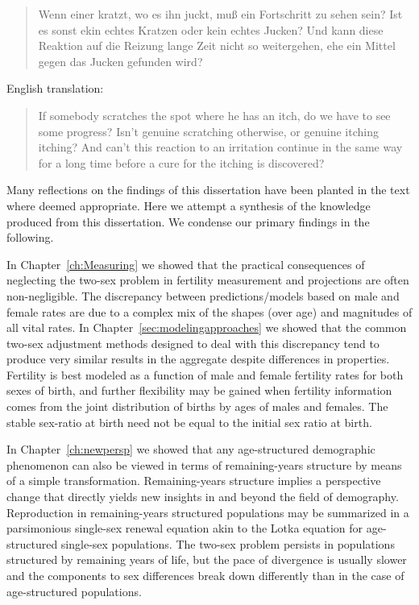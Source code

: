\FloatBarrier
\label{sec:reflections}

\begin{singlespace}
\begin{quote}
Wenn einer kratzt, wo es ihn juckt, mu{\ss} ein Fortschritt zu sehen sein? Ist
es sonst ekin echtes Kratzen oder kein echtes Jucken? Und kann diese Reaktion
auf die Reizung lange Zeit nicht so weitergehen, ehe ein Mittel gegen das Jucken
gefunden wird?
\citep{wittgenstein1984culture}
\end{quote}

English translation:
\begin{quote}
 If somebody scratches the spot where he has an itch, do we have to see 
 some progress? Isn't genuine scratching otherwise, or genuine itching 
itching? And can't this reaction to an irritation continue in the 
same way for a long time before a cure for the itching is discovered?
\citep{wittgenstein1984culture}
\end{quote}
\end{singlespace}

Many reflections on the findings of this dissertation have been planted in the
text where deemed appropriate. Here we attempt a synthesis of the
knowledge produced from this dissertation. We condense our primary findings in
the following.

In Chapter~\ref{ch:Measuring} we showed that the practical consequences of
neglecting the two-sex problem in fertility measurement and projections are often 
non-negligible. The discrepancy between 
predictions/models based on male and female rates are
due to a complex mix of the shapes (over age) and magnitudes of all vital rates. 
In Chapter~\ref{sec:modelingapproaches} we showed that the common two-sex
adjustment methods designed to deal with this discrepancy tend to produce very
similar results in the aggregate despite differences in properties. Fertility is
best modeled as a function of male and female fertility rates for both sexes of
birth, and further flexibility may be gained when fertility information comes
from the joint distribution of births by ages of males and females. The stable
sex-ratio at birth need not be equal to the initial sex ratio at birth.

In Chapter~\ref{ch:newpersp} we showed that any age-structured demographic
phenomenon can also be viewed in terms of remaining-years structure by means of a simple 
transformation. Remaining-years structure implies a perspective
change that directly yields new insights in and beyond the field of demography.
Reproduction in remaining-years structured populations may be summarized in a
parsimonious single-sex renewal equation akin to the Lotka equation
for age-structured single-sex populations. The two-sex problem
persists in populations structured by remaining years of life, but the pace of
divergence is usually slower and the components to sex differences break down
differently than in the case of age-structured populations. 

